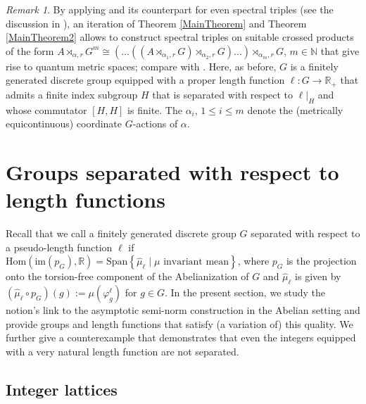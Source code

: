 \documentclass[a4paper,11pt,reqno]{amsart}
\numberwithin{equation}{section}
\numberwithin{equation}{section}
\theoremstyle{definition}
\theoremstyle{remark}
\theoremstyle{remark}
\newtheorem{remark}[theorem]{Remark}
\begin{document}
\begin{remark} By applying \cite[Proposition 2.8]{HSWZ13} and its counterpart for
even spectral triples (see the discussion in \cite[Subsection 2.4]{HSWZ13}),
an iteration of Theorem \ref{MainTheorem} and Theorem \ref{MainTheorem2} 
allows to construct spectral triples on suitable crossed products
of the form $A\rtimes_{\alpha,r}G^{m}\cong(...((A\rtimes_{\alpha_{1},r}G)\rtimes_{\alpha_{2},r}G)...)\rtimes_{\alpha_{m},r}G$,
$m\in\mathbb{N}$ that give rise to quantum metric spaces; compare
with \cite[Theorem 2.14]{HSWZ13}. Here, as before, $G$ is a finitely
generated discrete group equipped with a proper length function $\ell:G\rightarrow\mathbb{R}_{+}$
that admits a finite index subgroup $H$ that is separated with respect
to $\ell|_{H}$ and whose commutator $[H,H]$ is finite. The $\alpha_{i}$,
$1 \leq i \leq m $ denote the (metrically equicontinuous) coordinate $G$-actions
of $\alpha$. \end{remark}

\vspace{3mm}


\section{Groups separated with respect to length functions\label{SeparatedGroups}}

Recall that we call a finitely generated discrete group $G$ separated
with respect to a pseudo-length function $\ell$ if $\text{Hom}(\text{im}(p_{G}),\mathbb{R})=\text{Span}\left\{ \widehat{\mu}_{\ell}\mid\mu\text{ invariant mean}\right\} $,
where $p_{G}$ is the projection onto the torsion-free component of
the Abelianization of $G$ and $\widehat{\mu}_{\ell}$ is given by
$(\widehat{\mu}_{\ell}\circ p_{G})(g):=\mu(\varphi_{g}^{\ell})$ for
$g\in G$. In the present section, we study the notion's link to the
asymptotic semi-norm construction in the Abelian setting and provide
groups and length functions that satisfy (a variation of) this quality. We further
give a counterexample that demonstrates that even the integers equipped
with a very natural length function are not separated.

\vspace{3mm}


\subsection{Integer lattices\label{subsec:IntegerLattices}}
\end{document}
